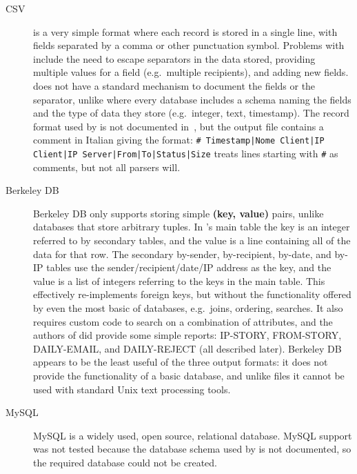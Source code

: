 \begin{description}

    \item [CSV]  is a very simple format where each record is
        stored in a single line, with fields separated by a comma or other
        punctuation symbol.  Problems with  include the need
        to escape separators in the data stored, providing multiple values
        for a field (e.g.\ multiple recipients), and adding new fields.
         does not have a standard mechanism to document the
        fields or the separator, unlike  where every database
        includes a schema naming the fields and the type of data they store
        (e.g.\ integer, text, timestamp).  The  record format
        used by  is not documented
        in~\cite{log-mail-analyser}, but the output file contains a comment
        in Italian giving the format:\newline{} \tab{} \texttt{\#
        Timestamp|Nome Client|IP Client|IP
        Server|From|To\newline{}\tab{}\tab{}|Status|Size}
        \newline{} treats  lines starting with
        \texttt{\#} as comments, but not all  parsers will.

    \item [Berkeley DB] Berkeley DB only supports storing simple
        \textbf{(key, value)} pairs, unlike  databases that
        store arbitrary tuples.  In 's main table the key is
        an integer referred to by secondary tables, and the value is a
         line containing all of the data for that row.  The
        secondary by-sender, by-recipient, by-date, and by-IP tables use
        the sender/recipient/date/IP address as the key, and the value is a
         list of integers referring to the keys in the main
        table.  This effectively re-implements  foreign keys,
        but without the functionality offered by even the most basic of
         databases, e.g.\ joins, ordering, searches.  It also
        requires custom code to search on a combination of attributes, and
        the authors of  did provide some simple reports:
        IP-STORY, FROM-STORY, DAILY-EMAIL, and DAILY-REJECT (all described
        later).  Berkeley DB appears to be the least useful of the three
        output formats: it does not provide the functionality of a basic
         database, and unlike  files it cannot be
        used with standard Unix text processing tools.

    \item [MySQL] MySQL is a widely used, open source, relational database.
         MySQL support was not tested because the database
        schema used by  is not documented, so the required
        database could not be created.

\end{description}


